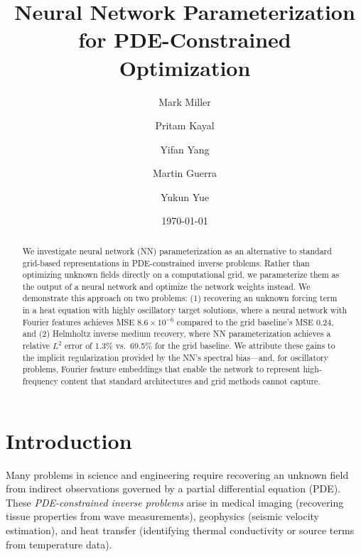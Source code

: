 \documentclass[11pt]{article}
\title{Neural Network Parameterization for PDE-Constrained\\Optimization}
\author{
  Mark Miller \and
  Pritam Kayal \and
  Yifan Yang \and
  Martin Guerra \and
  Yukun Yue
}
\date{\today}
\begin{document}
\maketitle

\begin{abstract}
We investigate neural network (NN) parameterization as an alternative to standard grid-based representations in PDE-constrained inverse problems. Rather than optimizing unknown fields directly on a computational grid, we parameterize them as the output of a neural network and optimize the network weights instead. We demonstrate this approach on two problems: (1) recovering an unknown forcing term in a heat equation with highly oscillatory target solutions, where a neural network with Fourier features achieves MSE $8.6 \times 10^{-6}$ compared to the grid baseline's MSE $0.24$, and (2) Helmholtz inverse medium recovery, where NN parameterization achieves a relative $L^2$ error of 1.3\% vs.\ 69.5\% for the grid baseline. We attribute these gains to the implicit regularization provided by the NN's spectral bias---and, for oscillatory problems, Fourier feature embeddings that enable the network to represent high-frequency content that standard architectures and grid methods cannot capture.
\end{abstract}


\section{Introduction}
\label{sec:intro}

Many problems in science and engineering require recovering an unknown field from indirect observations governed by a partial differential equation (PDE). These \emph{PDE-constrained inverse problems} arise in medical imaging (recovering tissue properties from wave measurements), geophysics (seismic velocity estimation), and heat transfer (identifying thermal conductivity or source terms from temperature data).
\end{document}
